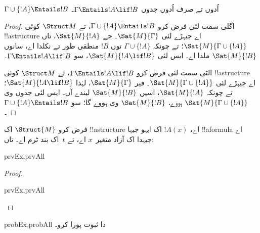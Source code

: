 \documentclass[../../../include/open-logic-section]{subfiles}
\begin{document}
\begin{thm}
$\Gamma \cup \{!A\} \Entails !B$ اُدوں تے صرف اُدوں جدوں
$\Gamma \Entails !A \lif !B$۔
\end{thm}

\begin{proof}
اگلی سمت لئی فرض کرو $\Gamma \cup \{ !A \} \Entails !B$، تے
$\Struct M$ کوئی !!a{structure} اے جیہڑے لئی $\Sat{M}{\Gamma}$۔
جے $\Sat{M}{!A}$، تاں $\Sat{M}{\Gamma \cup \{ !A \} }$؛ تے چونکہ
$\Gamma \cup \{ !A \}$ توں $!B$ منطقی طور تے نکلدا اے،
سانوں $\Sat{M}{!B}$ ملدا اے۔ ایس لئی $\Sat{M}{!A \lif !B}$،
سو $\Gamma \Entails !A \lif !B$۔

الٹی سمت لئی فرض کرو $\Gamma \Entails !A \lif !B$، تے
$\Struct M$ کوئی !!a{structure} اے جیہڑے لئی $\Sat{M}{\Gamma \cup \{ !A
  \}}$۔ فیر $\Sat{M}{\Gamma}$، لہٰذا $\Sat{M}{!A \lif !B}$؛
تے چونکہ $\Sat{M}{!A}$، اسیں $\Sat{M}{!B}$ لیندے آں۔ ایس لئی
جدوں وی $\Sat{M}{\Gamma \cup \{ !A \} }$ ہووے، $\Sat{M}{!B}$
وی ہووے گا؛ سو $\Gamma \cup \{ !A \} \Entails !B$۔
\end{proof}

\begin{prop}
  فرض کرو $\Struct{M}$ اک !!a{structure} اے، $!A(x)$ اک ایہو جیہا
  !!a{formula} اے جیہدا اک آزاد متغیر~$x$ اے، تے $t$~اک بند ٹرم اے۔ تاں:
  \begin{tagenumerate}{prvEx,prvAll}
  \end{tagenumerate}
\end{prop}

\begin{proof}
  \begin{tagenumerate}{prvEx,prvAll}
  \end{tagenumerate}
\end{proof}

\begin{probtag}{probEx,probAll}
   دا ثبوت پورا کرو۔
\end{probtag}
\end{document}
